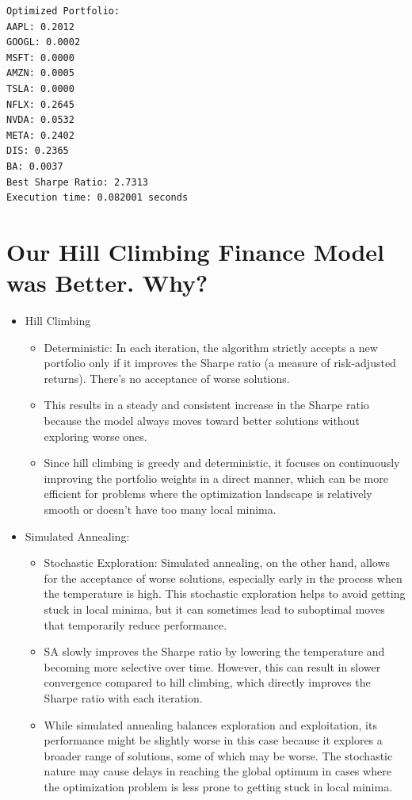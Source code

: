 \documentclass[
  letterpaper,
  DIV=11,
  numbers=noendperiod]{scrreprt}
\makeatletter
\providecommand{\tightlist}{%
  \setlength{\itemsep}{0pt}\setlength{\parskip}{0pt}}\usepackage{longtable,booktabs,array}
\newcommand*\pandocbounded[1]{%
  \sbox\pandoc@box{#1}%
  \Gscale@div\@tempa{\textheight}{\dimexpr\ht\pandoc@box+\dp\pandoc@box\relax}%
  \Gscale@div\@tempb{\linewidth}{\wd\pandoc@box}%
  \ifdim\@tempb\p@<\@tempa\p@\let\@tempa\@tempb\fi%
  \ifdim\@tempa\p@<\p@\scalebox{\@tempa}{\usebox\pandoc@box}%
  \else\usebox{\pandoc@box}%
  \fi%
}
\makeatother
\begin{document}
\pandocbounded{\texttt{[image: sa\_files/figure-pdf/cell-11-output-2.pdf]}}

\begin{verbatim}
Optimized Portfolio:
AAPL: 0.2012
GOOGL: 0.0002
MSFT: 0.0000
AMZN: 0.0005
TSLA: 0.0000
NFLX: 0.2645
NVDA: 0.0532
META: 0.2402
DIS: 0.2365
BA: 0.0037
Best Sharpe Ratio: 2.7313
Execution time: 0.082001 seconds
\end{verbatim}

\section{Our Hill Climbing Finance Model was Better.
Why?}\label{our-hill-climbing-finance-model-was-better.-why}

\begin{itemize}
\tightlist
\item
  Hill Climbing

  \begin{itemize}
  \tightlist
  \item
    Deterministic: In each iteration, the algorithm strictly accepts a
    new portfolio only if it improves the Sharpe ratio (a measure of
    risk-adjusted returns). There's no acceptance of worse solutions.
  \item
    This results in a steady and consistent increase in the Sharpe ratio
    because the model always moves toward better solutions without
    exploring worse ones.
  \item
    Since hill climbing is greedy and deterministic, it focuses on
    continuously improving the portfolio weights in a direct manner,
    which can be more efficient for problems where the optimization
    landscape is relatively smooth or doesn't have too many local
    minima.
  \end{itemize}
\item
  Simulated Annealing:

  \begin{itemize}
  \tightlist
  \item
    Stochastic Exploration: Simulated annealing, on the other hand,
    allows for the acceptance of worse solutions, especially early in
    the process when the temperature is high. This stochastic
    exploration helps to avoid getting stuck in local minima, but it can
    sometimes lead to suboptimal moves that temporarily reduce
    performance.
  \item
    SA slowly improves the Sharpe ratio by lowering the temperature and
    becoming more selective over time. However, this can result in
    slower convergence compared to hill climbing, which directly
    improves the Sharpe ratio with each iteration.
  \item
    While simulated annealing balances exploration and exploitation, its
    performance might be slightly worse in this case because it explores
    a broader range of solutions, some of which may be worse. The
    stochastic nature may cause delays in reaching the global optimum in
    cases where the optimization problem is less prone to getting stuck
    in local minima.
  \end{itemize}
\end{itemize}
\end{document}
